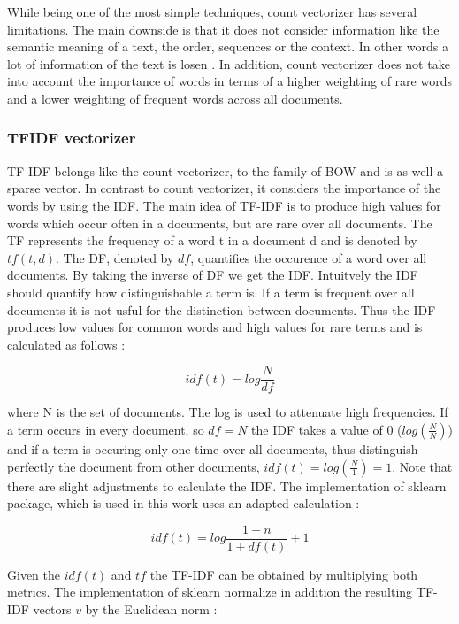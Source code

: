 \documentclass[12pt, a4paper, titlepage]{article}
\begin{document}
While being one of the most simple techniques, count vectorizer has several limitations. The main downside is that it does not consider information like the semantic meaning of a text, the order, sequences or the context. In other words a lot of information of the text is losen \citep{sarkar2016}. In addition, count vectorizer does not take into account the importance of words in terms of a higher weighting of rare words and a lower weighting of frequent words across all documents. \citep{suleymanov2019}

\subsubsection*{TFIDF vectorizer}
\ac{TF-IDF} belongs like the count vectorizer, to the family of \ac{BOW} and is as well a sparse vector. In contrast to count vectorizer, it considers the importance of the words by using the \ac{IDF}. The main idea of \ac{TF-IDF} is to produce high values for words which occur often in a documents, but are rare over all documents. The \ac{TF} represents the frequency of a word t in a document d and is denoted by $tf(t,d)$. The \ac{DF}, denoted by $df$, quantifies the occurence of a word over all documents. By taking the inverse of \ac{DF} we get the \ac{IDF}. Intuitvely the \ac{IDF} should quantify how distinguishable a term is. If a term is frequent over all documents it is not usful for the distinction between documents. Thus the \ac{IDF} produces low values for common words and high values for rare terms and is calculated as follows \citep{sidorov2019, kuang2010}: 

\[idf(t) = log \frac{N}{df} \]

where N is the set of documents. The log is used to attenuate high frequencies. If a term occurs in every document, so $df = N$ the \ac{IDF} takes a value of 0 ($log (\frac{N}{N})$) and if a term is occuring only one time over all documents, thus distinguish perfectly the document from other documents, $idf(t) = log (\frac{N}{1}) = 1$. \citep{sidorov2019} Note that there are slight adjustments to calculate the \ac{IDF}. \citep{robertson2004} The implementation of sklearn package, which is used in this work uses an adapted calculation \citep{scikit-learn}:

\[idf(t) = log \frac{1+n}{1+df(t)} + 1 \] 

Given the $idf(t)$ and $tf$ the \ac{TF-IDF} can be obtained by multiplying both metrics. The implementation of sklearn normalize in addition the resulting \ac{TF-IDF} vectors $v$ by the Euclidean norm \citep{scikit-learn}: 
\end{document}
